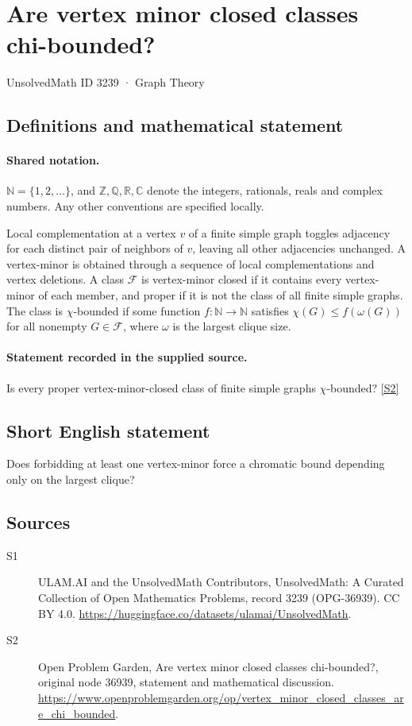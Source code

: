 \documentclass[11pt]{article}
\newcommand{\sref}[2]{\hyperlink{source:#1:#2}{[S#2]}}
\begin{document}
\setcounter{section}{3238}
\section{Are vertex minor closed classes chi-bounded?}\label{3239}
{\small\sffamily UnsolvedMath ID 3239 · Graph Theory}
\subsection{Definitions and mathematical statement}

\paragraph{Shared notation.}$\mathbb N=\{1,2,\ldots\}$, and $\mathbb Z,\mathbb Q,\mathbb R,\mathbb C$ denote the integers, rationals, reals and complex numbers. Any other conventions are specified locally.


Local complementation at a vertex $v$ of a finite simple graph toggles adjacency for each distinct pair of neighbors of $v$, leaving all other adjacencies unchanged. A vertex-minor is obtained through a sequence of local complementations and vertex deletions. A class $\mathcal F$ is vertex-minor closed if it contains every vertex-minor of each member, and proper if it is not the class of all finite simple graphs. The class is $\chi$-bounded if some function $f:\mathbb N\to\mathbb N$ satisfies $\chi(G)\le f(\omega(G))$ for all nonempty $G\in\mathcal F$, where $\omega$ is the largest clique size.
\paragraph{Statement recorded in the supplied source.}
Is every proper vertex-minor-closed class of finite simple graphs $\chi$-bounded? \sref{3239}{2}
\subsection{Short English statement}
Does forbidding at least one vertex-minor force a chromatic bound depending only on the largest clique?
\subsection{Sources}
\begin{description}
\item[\hypertarget{source:3239:1}{S1}] ULAM.AI and the UnsolvedMath Contributors, UnsolvedMath: A Curated Collection of Open Mathematics Problems, record 3239 (OPG-36939). CC BY 4.0. \url{https://huggingface.co/datasets/ulamai/UnsolvedMath}.
\item[\hypertarget{source:3239:2}{S2}] Open Problem Garden, Are vertex minor closed classes chi-bounded?, original node 36939, statement and mathematical discussion. \url{https://www.openproblemgarden.org/op/vertex_minor_closed_classes_are_chi_bounded}.
\end{description}
\label{end:3239}
\end{document}
